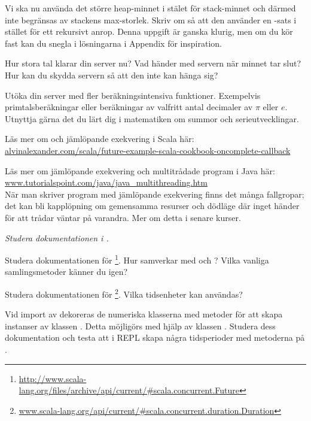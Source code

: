 \Subtask Vi ska nu använda det större heap-minnet i stälet för stack-minnet och därmed inte begränsas av stackens max-storlek. Skriv om  så att den använder en -sats i stället för ett rekursivt anrop. Denna uppgift är ganska klurig, men om du kör fast kan du snegla i lösningarna i Appendix för inspiration. 

Hur stora tal klarar din server nu? Vad händer med servern när minnet tar slut? Hur kan du skydda servern så att den inte kan hänga sig?

\Task Utöka din server med fler beräkningsintensiva funktioner. Exempelvis primtalsberäkningar eller beräkningar av valfritt antal decimaler av $\pi$ eller $e$. Utnyttja gärna det du lärt dig i  matematiken om summor och serieutvecklingar.

\Task Läs mer om  och jämlöpande exekvering i Scala här:\\
\href{http://alvinalexander.com/scala/future-example-scala-cookbook-oncomplete-callback}{alvinalexander.com/scala/future-example-scala-cookbook-oncomplete-callback}

\Task Läs mer om jämlöpande exekvering och multitrådade program i Java här: \href{http://www.tutorialspoint.com/java/java_multithreading.htm}{www.tutorialspoint.com/java/java\_multithreading.htm}  \\
\noindent När man skriver program med jämlöpande exekvering finns det många fallgropar; det kan bli kapplöpning  om gemensamma resurser och dödläge  där inget händer för att trådar väntar på varandra. Mer om detta i senare kurser. 


\Task\Pen \emph{Studera dokumentationen i .} 

\Subtask Studera dokumentationen för \footnote{\href{http://www.scala-lang.org/files/archive/api/current/\#scala.concurrent.Future}{http://www.scala-lang.org/files/archive/api/current/\#scala.concurrent.Future}}. Hur samverkar  med  och ? Vilka vanliga samlingsmetoder känner du igen?

\Subtask Studera dokumentationen för \footnote{\href{http://www.scala-lang.org/api/current/\#scala.concurrent.duration.Duration}{www.scala-lang.org/api/current/\#scala.concurrent.duration.Duration}}. Vilka tidsenheter kan användas? 

\Subtask Vid import av  dekoreras de numeriska klasserna med metoder för att skapa instanser av klassen . Detta möjligörs med hjälp av klassen . Studera dess dokumentation och testa att i REPL skapa några tidsperioder med metoderna på .



